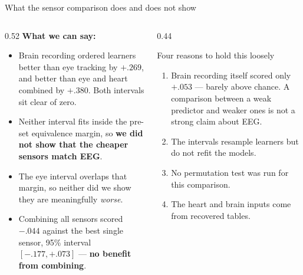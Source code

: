 \documentclass[aspectratio=169,10pt]{beamer}
\begin{document}
\begin{frame}{What the sensor comparison does and does not show}
  \begin{columns}[T]
    \begin{column}{0.52\textwidth}
      \textbf{What we can say:}
      \begin{itemize}\small
        \item Brain recording ordered learners better than eye tracking by
          $+.269$, and better than eye and heart combined by $+.380$. Both
          intervals sit clear of zero.
        \item Neither interval fits inside the pre-set equivalence margin, so
          \textbf{we did not show that the cheaper sensors match EEG}.
        \item The eye interval overlaps that margin, so neither did we show
          they are meaningfully \emph{worse}.
        \item Combining all sensors scored $-.044$ against the best single
          sensor, 95\% interval $[-.177, +.073]$ ---
          \textbf{no benefit from combining}.
      \end{itemize}
    \end{column}
    \begin{column}{0.44\textwidth}
      \begin{block}{Four reasons to hold this loosely}
        \small
        \begin{enumerate}
          \item Brain recording itself scored only $+.053$ --- barely above
            chance. A comparison between a weak predictor and weaker ones is
            not a strong claim about EEG.
          \item The intervals resample learners but do not refit the models.
          \item No permutation test was run for this comparison.
          \item The heart and brain inputs come from recovered tables.
        \end{enumerate}
      \end{block}
    \end{column}
  \end{columns}
\end{frame}
\end{document}
